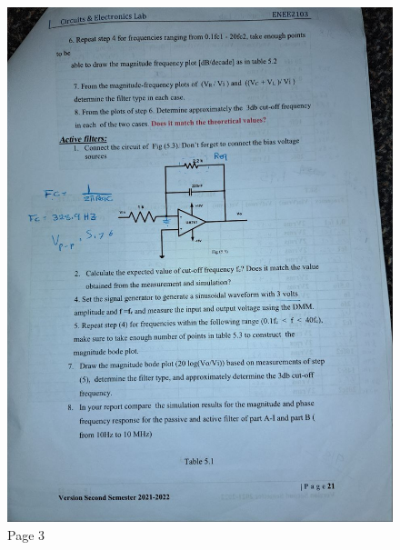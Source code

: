 \documentclass[12pt]{article}
\begin{document}
\begin{figure}[H]
    \centering
    \includegraphics[width=\textwidth]{assets/i3.jpg}
    \caption{Page 3}
\end{figure}
\end{document}

